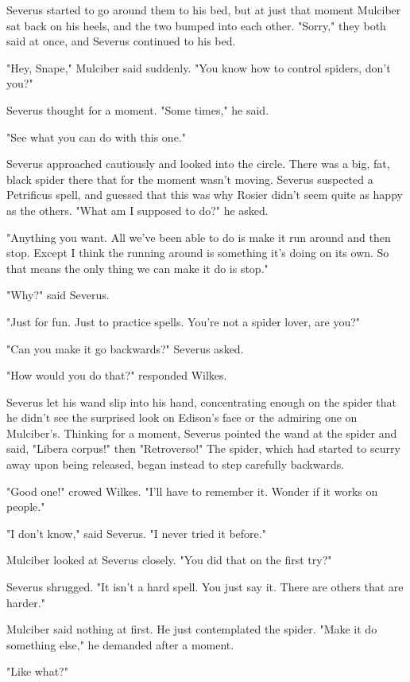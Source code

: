 Severus started to go around them to his bed, but at just that moment Mulciber sat back on his heels, and the two bumped into each other. "Sorry," they both said at once, and Severus continued to his bed.

"Hey, Snape," Mulciber said suddenly. "You know how to control spiders, don't you?"

Severus thought for a moment. "Some{\el} times," he said.

"See what you can do with this one."

Severus approached cautiously and looked into the circle. There was a big, fat, black spider there that for the moment wasn't moving. Severus suspected a Petrificus spell, and guessed that this was why Rosier didn't seem quite as happy as the others. "What am I{\el} supposed to do?" he asked.

"Anything you want. All we've been able to do is make it run around and then stop. Except I think the running around is something it's doing on its own. So that means the only thing we can make it do is stop."

"Why?" said Severus.

"Just for fun. Just to practice spells. You're not a spider lover, are you?"

"Can you{\el} make it go{\el} backwards?" Severus asked.

"How would you do that?" responded Wilkes.

Severus let his wand slip into his hand, concentrating enough on the spider that he didn't see the surprised look on Edison's face or the admiring one on Mulciber's. Thinking for a moment, Severus pointed the wand at the spider and said, "Libera corpus!" then "Retroverso!" The spider, which had started to scurry away upon being released, began instead to step carefully backwards.

"Good one!" crowed Wilkes. "I'll have to remember it. Wonder if it works on people."

"I don't{\el} know," said Severus. "I never{\el} tried it before."

Mulciber looked at Severus closely. "You did that on the first try?"

Severus shrugged. "It isn't a{\el} hard spell. You just{\el} say it. There are{\el} others that are{\el} harder."

Mulciber said nothing at first. He just contemplated the spider. "Make it do something else," he demanded after a moment.

"Like what?"

